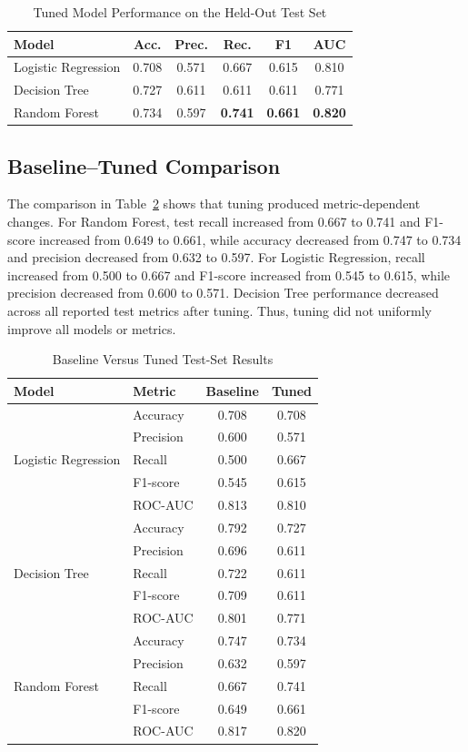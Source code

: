 \documentclass[12pt,a4paper]{article}
\begin{document}
\begin{table}[t]
\caption{Tuned Model Performance on the Held-Out Test Set}
\label{tab:tuned}
\centering
\begin{tabular}{lccccc}
\toprule
Model & Acc. & Prec. & Rec. & F1 & AUC\\
\midrule
Logistic Regression & 0.708 & 0.571 & 0.667 & 0.615 & 0.810\\
Decision Tree & 0.727 & 0.611 & 0.611 & 0.611 & 0.771\\
Random Forest & 0.734 & 0.597 & \textbf{0.741} & \textbf{0.661} & \textbf{0.820}\\
\bottomrule
\end{tabular}
\end{table}

\subsection{Baseline--Tuned Comparison}
The comparison in Table~\ref{tab:comparison} shows that tuning produced metric-dependent changes. For Random Forest, test recall increased from 0.667 to 0.741 and F1-score increased from 0.649 to 0.661, while accuracy decreased from 0.747 to 0.734 and precision decreased from 0.632 to 0.597. For Logistic Regression, recall increased from 0.500 to 0.667 and F1-score increased from 0.545 to 0.615, while precision decreased from 0.600 to 0.571. Decision Tree performance decreased across all reported test metrics after tuning. Thus, tuning did not uniformly improve all models or metrics.

\begin{table}[t]
\caption{Baseline Versus Tuned Test-Set Results}
\label{tab:comparison}
\centering
\begin{tabular}{llcc}
\toprule
Model & Metric & Baseline & Tuned\\
\midrule
\multirow{5}{*}{Logistic Regression}
& Accuracy & 0.708 & 0.708\\
& Precision & 0.600 & 0.571\\
& Recall & 0.500 & 0.667\\
& F1-score & 0.545 & 0.615\\
& ROC-AUC & 0.813 & 0.810\\
\midrule
\multirow{5}{*}{Decision Tree}
& Accuracy & 0.792 & 0.727\\
& Precision & 0.696 & 0.611\\
& Recall & 0.722 & 0.611\\
& F1-score & 0.709 & 0.611\\
& ROC-AUC & 0.801 & 0.771\\
\midrule
\multirow{5}{*}{Random Forest}
& Accuracy & 0.747 & 0.734\\
& Precision & 0.632 & 0.597\\
& Recall & 0.667 & 0.741\\
& F1-score & 0.649 & 0.661\\
& ROC-AUC & 0.817 & 0.820\\
\bottomrule
\end{tabular}
\end{table}
\end{document}
